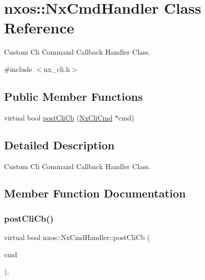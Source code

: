 \hypertarget{classnxos_1_1_nx_cmd_handler}{}\section{nxos\+:\+:Nx\+Cmd\+Handler Class Reference}
\label{classnxos_1_1_nx_cmd_handler}


Custom Cli Command Callback Handler Class.  




{\ttfamily \#include $<$nx\+\_\+cli.\+h$>$}

\subsection*{Public Member Functions}
\begin{DoxyCompactItemize}
\item 
virtual bool \mbox{\hyperlink{classnxos_1_1_nx_cmd_handler_ab60a4672e08b1acd1faa249936963ead}{post\+Cli\+Cb}} (\mbox{\hyperlink{classnxos_1_1_nx_cli_cmd}{Nx\+Cli\+Cmd}} $\ast$cmd)
\end{DoxyCompactItemize}


\subsection{Detailed Description}
Custom Cli Command Callback Handler Class. 

\subsection{Member Function Documentation}
\mbox{\label{classnxos_1_1_nx_cmd_handler_ab60a4672e08b1acd1faa249936963ead}} 
\subsubsection{\texorpdfstring{post\+Cli\+Cb()}{postCliCb()}}
{\footnotesize\ttfamily virtual bool nxos\+::\+Nx\+Cmd\+Handler\+::post\+Cli\+Cb (\begin{DoxyParamCaption}\item[{\mbox{\hyperlink{classnxos_1_1_nx_cli_cmd}{Nx\+Cli\+Cmd}} $\ast$}]{cmd }\end{DoxyParamCaption})\hspace{0.3cm}{\ttfamily [inline]}, {\ttfamily [virtual]}}

